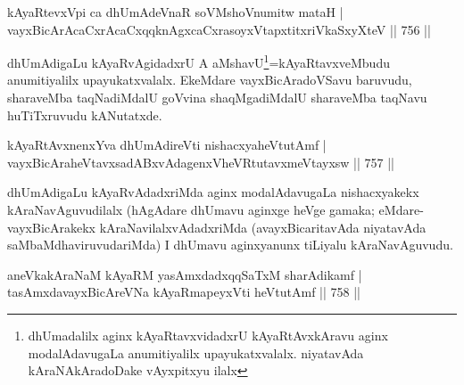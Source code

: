 
\begin{shl}
kAyaRtevxV\s pi ca dhUmAdeVnaR soVM\s shoV\s numitw mataH | \\
vayxBicArA\footnotemark[4]caCxrAcaCxqqknAgxcaCxrasoyxVtapxtitxriVkaSxyXteV \hfill||  756 ||  
\end{shl}

\begin{artha}
dhUmAdigaLu kAyaRvAgidadxrU A aMshavU\footnote[3]{dhUmadalilx aginx kAyaRtavxvidadxrU kAyaRtAvxkAravu aginx modalAdavugaLa anumitiyalilx upayukatxvalalx. niyatavAda kAraNAkAradoDake vAyxpitxyu ilalx}=kAyaRtavxveMbudu anumitiyalilx upayukatxvalalx. EkeMdare vayxBicAradoVSavu baruvudu, sharaveMba taqNadiMdalU goVvina shaqMgadiMdalU sharaveMba taqNavu huTiTxruvudu kANutatxde.
\end{artha}


\begin{shl}
kAyaRtAvxnenxYva dhUmAdireVti nishacxyaheVtutAmf | \\
vayxBicAraheVtavxsadABxvAdagenxVheVRtutavxmeVtayxsw \hfill||  757 ||  
\end{shl}

\begin{artha}
dhUmAdigaLu kAyaRvAdadxriMda aginx modalAdavugaLa nishacxyakekx kAraNavAguvudilalx (hAgAdare dhUmavu aginxge heVge gamaka; eMdare- vayxBicArakekx kAraNavilalxvAdadxriMda (avayxBicaritavAda niyatavAda saMbaMdhaviruvudariMda) I dhUmavu aginxyanunx tiLiyalu kAraNavAguvudu.
\end{artha}


\begin{shl}
aneVkakAraNaM kAyaRM yasAmxdadxqqSaTxM sharAdikamf | \\
tasAmxdavayxBicAreVNa kAyaRmapeyxVti heVtutAmf \hfill||  758 ||  
\end{shl}

